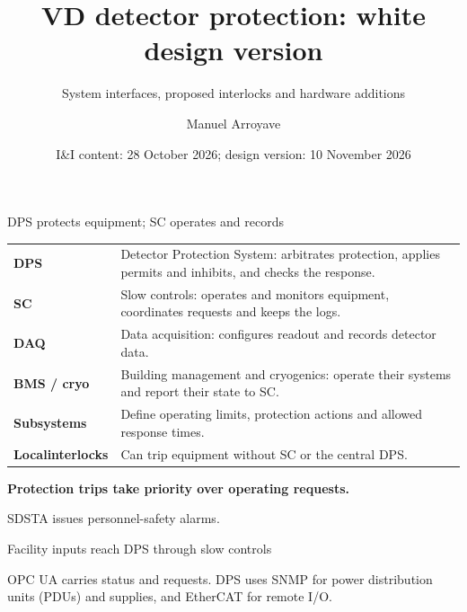 \documentclass[aspectratio=169,11pt]{beamer}
\title{VD detector protection: white design version}
\subtitle{System interfaces, proposed interlocks and hardware additions}
\author{Manuel Arroyave}
\date{I\&I content: 28 October 2026; design version: 10 November 2026}
\begin{document}
\begin{frame}{DPS protects equipment; SC operates and records}
\renewcommand{\arraystretch}{1.18}
\begin{tabularx}{\textwidth}{@{}>{\RaggedRight\arraybackslash}p{2.2cm}>{\RaggedRight\arraybackslash}X@{}}
\textbf{DPS} & Detector Protection System: arbitrates protection, applies permits and inhibits, and checks the response.\\
\textbf{SC} & Slow controls: operates and monitors equipment, coordinates requests and keeps the logs.\\
\textbf{DAQ} & Data acquisition: configures readout and records detector data.\\
\textbf{BMS / cryo} & Building management and cryogenics: operate their systems and report their state to SC.\\
\textbf{Subsystems} & Define operating limits, protection actions and allowed response times.\\
\textbf{Local\newline interlocks} & Can trip equipment without SC or the central DPS.\\
\end{tabularx}\par\bigskip
\textbf{Protection trips take priority over operating requests.}\par\medskip
SDSTA issues personnel-safety alarms.
\end{frame}

\begin{frame}{Facility inputs reach DPS through slow controls}
\centering
{}\par\medskip
\raggedright{}\par\medskip
\raggedright

OPC UA carries status and requests. DPS uses SNMP for power distribution units (PDUs) and supplies, and EtherCAT for remote I/O.
\end{frame}
\end{document}
